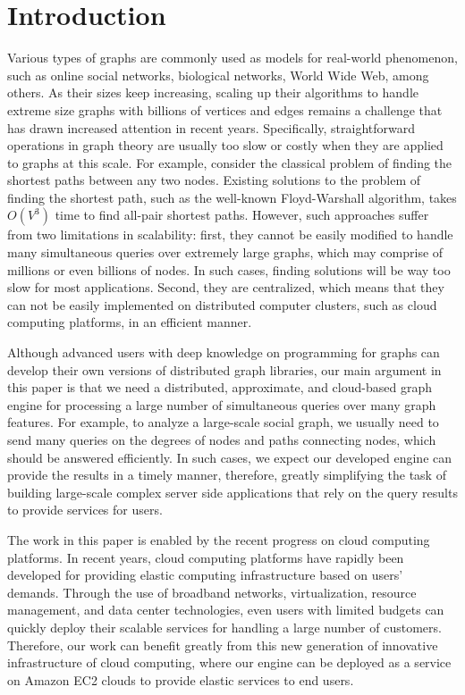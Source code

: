 \section{Introduction}
\label{introduction}

Various types of graphs are commonly used as models for real-world phenomenon, such as online social networks, biological networks, World Wide Web, among others. As their sizes keep increasing, scaling up their algorithms to handle extreme size graphs with billions of vertices and edges remains a challenge that has drawn increased attention in recent years. Specifically, straightforward operations in graph theory are usually too slow or costly when they are applied to graphs at this scale. For example, consider the classical problem of finding the shortest paths between any two nodes. Existing solutions to the problem of finding the shortest path, such as the well-known Floyd-Warshall algorithm, takes $O(V^3)$ time to find all-pair shortest paths. However, such approaches suffer from two limitations in scalability: first, they cannot be easily modified to handle many simultaneous queries over extremely large graphs, which may comprise of millions or even billions of nodes. In such cases, finding solutions will be way too slow for most applications. Second, they are centralized, which means that they can not be easily implemented on distributed computer clusters, such as cloud computing platforms, in an efficient manner. 

Although advanced users with deep knowledge on programming for graphs can develop their own versions of distributed graph libraries, our main argument in this paper is that we need a distributed, approximate, and cloud-based graph engine for processing a large number of
simultaneous queries over many graph features. For example, to analyze a large-scale social graph, we usually need to send many queries on the degrees of nodes and paths connecting nodes, which should be answered efficiently. In such cases, we expect our developed engine can provide the results in a timely manner, therefore, greatly simplifying the task of building large-scale complex server side applications that rely on the query results to provide services for users.

The work in this paper is enabled by the recent progress on cloud computing platforms. In recent years, cloud computing platforms have rapidly been developed for providing
elastic computing infrastructure based on users' demands. Through the use of broadband networks, virtualization, resource management, and data center technologies, even users
with limited budgets can quickly deploy their scalable services for handling a large number of customers. Therefore, our work can benefit greatly from this new generation of innovative infrastructure of cloud computing, where our engine can be deployed as a
service on Amazon EC2 clouds to provide elastic services to end users. 

